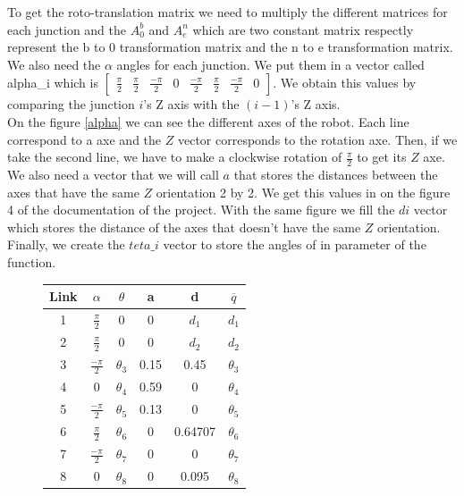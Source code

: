 \documentclass[english,a4paper,11pt]{report}
\begin{document}
	To get the roto-translation matrix we need to multiply the different matrices for each junction and the $A^{b}_{0}$ and $A^{n}_{e}$ which are two constant matrix respectly represent the b to 0 transformation matrix and the n to e transformation matrix.\\
	We also need the $\alpha$ angles for each junction. We put them in a vector called alpha\_i which is $\begin{bmatrix}\frac{\pi}{2} & \frac{\pi}{2} & \frac{-\pi}{2} & 0 & \frac{-\pi}{2} & \frac{\pi}{2} & \frac{-\pi}{2} & 0\end{bmatrix}$. We obtain this values by comparing the junction $i$\rq{}s Z axis with the $(i-1)$\rq{}s Z axis.\\
	On the figure \ref{alpha} we can see the different axes of the robot. Each line correspond to a axe and the $Z$ vector corresponds to the rotation axe. Then, if we take the second line, we have to make a clockwise rotation of $\frac{\pi}{2}$ to get its $Z$ axe.\\
	We also need a vector that we will call $a$ that stores the distances between the axes that have the same $Z$ orientation 2 by 2. We get this values in on the figure 4 of the documentation of the project. With the same figure we fill the $di$ vector which stores the distance of the axes that doesn\rq{}t have the same $Z$ orientation.
	Finally, we create the $teta\_i$ vector to store the angles of in parameter of the function.
	\begin{center}
	\begin{figure}
		\begin{tabular}{c|c|c|c|c|c}
		Link & $\alpha$ & $\theta$ & a & d & $ \overline{q}$\\
		\hline
		1 & $\frac{\pi}{2}$ & 0 & 0 & $d_1$ &$ d_1$\\
		\hline
		2 & $\frac{\pi}{2}$ & 0 & 0 & $d_2$ & $d_2$\\
		\hline
		3 & $\frac{-\pi}{2}$ & $\theta_3$ & 0.15 & 0.45 & $\theta_3$\\
		\hline
		4 & 0 & $\theta_4$ & 0.59 & 0 & $\theta_4$\\
		\hline
		5 & $\frac{-\pi}{2}$ & $\theta_5$ & 0.13 & 0 & $\theta_5$ \\
		\hline
		6 & $\frac{\pi}{2}$ & $\theta_6$ & 0 & 0.64707 & $\theta_6$\\
		\hline
		7 & $\frac{-\pi}{2}$ & $\theta_7$ & 0 & 0 & $\theta_7$ \\
		\hline
		8 & 0 & $\theta_8$ & 0 & 0.095 & $\theta_8$\\
		\end{tabular}
	
	\end{figure}
	\end{center}
	
\end{document}
